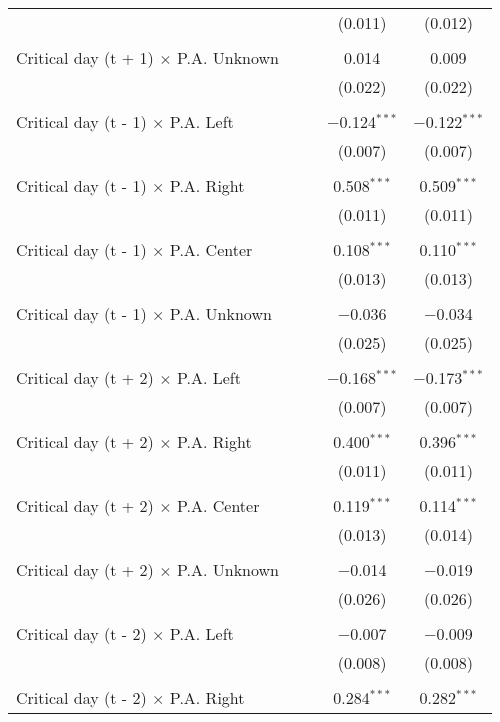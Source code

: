 \documentclass[
]{article}
\begin{document}
\begin{table}[!htbp]
{\begin{tabular}{@{\extracolsep{5pt}}lcccc}
  &  &  & (0.011) & (0.012) \\ 
  & & & & \\ 
 Critical day (t + 1) $\times$ P.A. Unknown &  &  & 0.014 & 0.009 \\ 
  &  &  & (0.022) & (0.022) \\ 
  & & & & \\ 
 Critical day (t - 1) $\times$ P.A. Left &  &  & $-$0.124$^{***}$ & $-$0.122$^{***}$ \\ 
  &  &  & (0.007) & (0.007) \\ 
  & & & & \\ 
 Critical day (t - 1) $\times$ P.A. Right &  &  & 0.508$^{***}$ & 0.509$^{***}$ \\ 
  &  &  & (0.011) & (0.011) \\ 
  & & & & \\ 
 Critical day (t - 1) $\times$ P.A. Center &  &  & 0.108$^{***}$ & 0.110$^{***}$ \\ 
  &  &  & (0.013) & (0.013) \\ 
  & & & & \\ 
 Critical day (t - 1) $\times$ P.A. Unknown &  &  & $-$0.036 & $-$0.034 \\ 
  &  &  & (0.025) & (0.025) \\ 
  & & & & \\ 
 Critical day (t + 2) $\times$ P.A. Left &  &  & $-$0.168$^{***}$ & $-$0.173$^{***}$ \\ 
  &  &  & (0.007) & (0.007) \\ 
  & & & & \\ 
 Critical day (t + 2) $\times$ P.A. Right &  &  & 0.400$^{***}$ & 0.396$^{***}$ \\ 
  &  &  & (0.011) & (0.011) \\ 
  & & & & \\ 
 Critical day (t + 2) $\times$ P.A. Center &  &  & 0.119$^{***}$ & 0.114$^{***}$ \\ 
  &  &  & (0.013) & (0.014) \\ 
  & & & & \\ 
 Critical day (t + 2) $\times$ P.A. Unknown &  &  & $-$0.014 & $-$0.019 \\ 
  &  &  & (0.026) & (0.026) \\ 
  & & & & \\ 
 Critical day (t - 2) $\times$ P.A. Left &  &  & $-$0.007 & $-$0.009 \\ 
  &  &  & (0.008) & (0.008) \\ 
  & & & & \\ 
 Critical day (t - 2) $\times$ P.A. Right &  &  & 0.284$^{***}$ & 0.282$^{***}$ \\ 

\end{tabular}}
\end{table}
\end{document}
